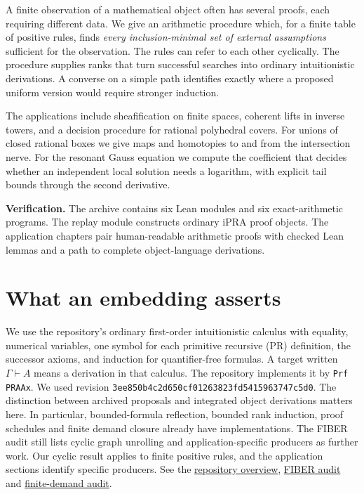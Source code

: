 \documentclass[11pt,letterpaper]{article}
\newcommand{\repo}[2]{\href{https://github.com/VladimirReshetnikov/ProveIt/blob/3ee850b4c2d650cf01263823fd5415963747c5d0/Logic/PrimitiveRecursiveArithmetic/#1}{#2}}
\begin{document}
\thispagestyle{plain}
\par
\vspace{1em}
\vspace{.55em}
\vspace{1em}
\noindent A finite observation of a mathematical object often has several proofs, each requiring different data. We give an arithmetic procedure which, for a finite table of positive rules, finds \emph{every inclusion-minimal set of external assumptions} sufficient for the observation. The rules can refer to each other cyclically. The procedure supplies ranks that turn successful searches into ordinary intuitionistic derivations. A converse on a simple path identifies exactly where a proposed uniform version would require stronger induction.

\medskip
\noindent The applications include sheafification on finite spaces, coherent lifts in inverse towers, and a decision procedure for rational polyhedral covers. For unions of closed rational boxes we give maps and homotopies to and from the intersection nerve. For the resonant Gauss equation we compute the coefficient that decides whether an independent local solution needs a logarithm, with explicit tail bounds through the second derivative.

\medskip
\noindent\textbf{Verification.} The archive contains six Lean modules and six exact-arithmetic programs. The replay module constructs ordinary iPRA proof objects. The application chapters pair human-readable arithmetic proofs with checked Lean lemmas and a path to complete object-language derivations.

\tableofcontents
\newpage
\section{What an embedding asserts}
\label{sec:scope}
We use the repository's ordinary first-order intuitionistic calculus with equality, numerical variables, one symbol for each primitive recursive (PR) definition, the successor axioms, and induction for quantifier-free formulas. A target written $\Gamma\vdash A$ means a derivation in that calculus. The repository implements it by \texttt{Prf PRAAx}. We used revision \texttt{3ee850b4c2d650cf01263823fd5415963747c5d0}. The distinction between archived proposals and integrated object derivations matters here. In particular, bounded-formula reflection, bounded rank induction, proof schedules and finite demand closure already have implementations. The FIBER audit still lists cyclic graph unrolling and application-specific producers as further work. Our cyclic result applies to finite positive rules, and the application sections identify specific producers. See the \repo{README.md}{repository overview}, \repo{Derivations/FIBER-CLAIMS.md}{FIBER audit} and \repo{Derivations/FINITE-DEMAND-CLAIMS.md}{finite-demand audit}.
\end{document}
